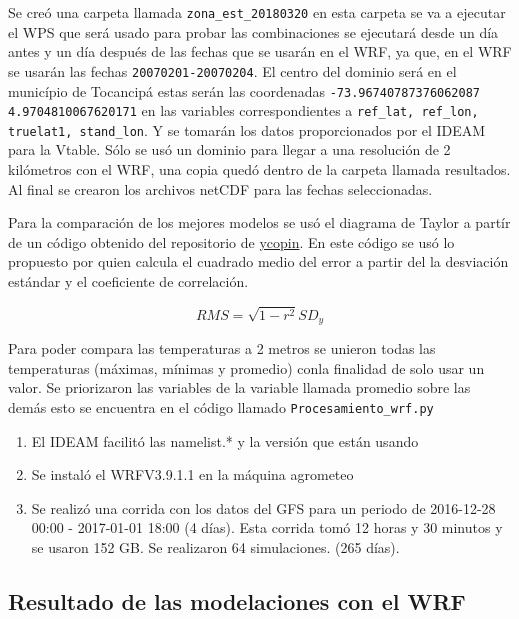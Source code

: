 Se creó una carpeta llamada \texttt{zona\_est\_20180320} en esta carpeta se va a ejecutar el WPS que será usado para probar las combinaciones se ejecutará desde un día antes y un día después de las fechas que se usarán en el WRF, ya que, en el WRF se usarán las fechas \texttt{20070201-20070204}. El centro del dominio será en el município de Tocancipá estas serán las coordenadas \texttt{-73.96740787376062087 4.9704810067620171} en las variables correspondientes a \texttt{ref\_lat, ref\_lon, truelat1, stand\_lon}. Y se tomarán los datos proporcionados por el IDEAM para la Vtable. Sólo se usó un dominio para llegar a una resolución de 2 kilómetros con el WRF, una copia quedó dentro de la carpeta llamada resultados.\\

Al final se crearon los archivos netCDF para las fechas seleccionadas. 

Para la comparación de los mejores modelos se usó el diagrama de Taylor a partír de un código obtenido del repositorio de \textcolor{blue}{ \href{https://gist.github.com/ycopin/3342888}{ycopin}}. En este código se usó lo propuesto por \citet{barnston1992} quien calcula el cuadrado medio del error a partir del la desviación estándar y el coeficiente de correlación.

\begin{equation}\label{eq:rms}
	     RMS = \sqrt{1-r^{2}}SD_{y}
\end{equation}

Para poder compara las temperaturas a 2 metros se unieron todas las temperaturas (máximas, mínimas y promedio) conla finalidad de solo usar un valor. Se priorizaron las variables de la variable llamada promedio sobre las demás esto se encuentra en el código llamado \texttt{Procesamiento\_wrf.py}

\begin{enumerate}

\item El IDEAM facilitó las namelist.* y la versión que están usando
\item Se instaló el WRFV3.9.1.1 en la máquina agrometeo
\item Se realizó una corrida con los datos del GFS para un periodo de 2016-12-28 00:00 - 2017-01-01 18:00 (4 días). Esta corrida tomó 12 horas y 30 minutos y se usaron 152 GB. Se realizaron 64 simulaciones. (265 días).

\end{enumerate}

\subsection{Resultado de las modelaciones con el WRF}

